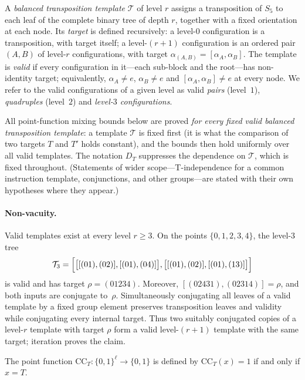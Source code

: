 \documentclass[version=final]{iacrcc}
\newcommand{\CC}{\mathrm{CC}}
\begin{document}
\begin{definition}
\label{def:validtemplate}
A \emph{balanced transposition template} $\mathcal{T}$ of level $r$ assigns a
transposition of $S_5$ to each leaf of the complete binary tree of depth $r$,
together with a fixed orientation at each node. Its \emph{target} is defined
recursively: a level-$0$ configuration is a transposition, with target itself;
a level-$(r{+}1)$ configuration is an ordered pair $(A,B)$ of level-$r$
configurations, with target $\alpha_{(A,B)} = [\alpha_A, \alpha_B]$. The
template is \emph{valid} if every configuration in it---each sub-block and the
root---has non-identity target; equivalently, $\alpha_A \neq e$, $\alpha_B \neq e$
and $[\alpha_A,\alpha_B] \neq e$ at every node. We refer to the valid
configurations of a given level as valid \emph{pairs} (level~$1$),
\emph{quadruples} (level~$2$) and \emph{level-$3$ configurations}.

All point-function mixing bounds below are proved \emph{for every fixed valid
balanced transposition template}: a template $\mathcal{T}$ is fixed first (it is
what the comparison of two targets $T$ and $T'$ holds constant), and the bounds
then hold uniformly over all valid templates. The notation $D_T$ suppresses the
dependence on $\mathcal{T}$, which is fixed throughout. (Statements of wider
scope---T-independence for a common instruction template, conjunctions, and other
groups---are stated with their own hypotheses where they appear.)
\end{definition}

\paragraph{Non-vacuity.}
Valid templates exist at every level $r\geq3$.  On the points
$\{0,1,2,3,4\}$, the level-$3$ tree
\[
\mathcal{T}_3=
\Bigl[
  \bigl[[(01),(02)],[(01),(04)]\bigr],
  \bigl[[(01),(02)],[(01),(13)]\bigr]
\Bigr]
\]
is valid and has target $\rho=(01234)$.  Moreover,
$[(02431),(02314)]=\rho$, and both inputs are conjugate to~$\rho$.
Simultaneously conjugating all leaves of a valid template by a fixed group
element preserves transposition leaves and validity while conjugating every
internal target.  Thus two suitably conjugated copies of a level-$r$ template
with target $\rho$ form a valid level-$(r+1)$ template with the same target;
iteration proves the claim.

\begin{definition}
The point function $\CC_T : \{0,1\}^\ell \to \{0,1\}$ is defined by
$\CC_T(x) = 1$ if and only if $x = T$.
\end{definition}
\end{document}
